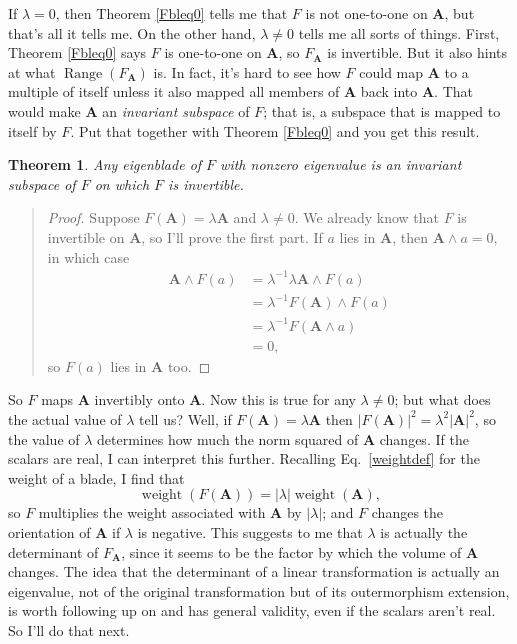 \documentclass{utarticle}
\newcommand{\bl}[1]{\ensuremath{\bm{#1}}}
\DeclareMathOperator{\out}{\wedge}
\newcommand{\weight}{\operatorname{weight}}
\newcommand{\Range}{\operatorname{Range}}
\newtheorem{thm}{Theorem}
\newcommand{\bp}{\begin{quotation} \begin{proof}}
\newcommand{\ep}{\end{proof} \end{quotation}}
\begin{document}
If $\lambda = 0$, then Theorem \ref{Fbleq0} tells me that $F$ is not one-to-one 
on \bl{A}, but that's all it tells me.  On the other hand, $\lambda \neq 0$ tells me all sorts of things.
First, Theorem \ref{Fbleq0} says $F$ is one-to-one on \bl{A}, so $F_{\bl{A}}$ is invertible.  But 
it also hints at what $\Range(F_{\bl{A}})$ is.  In fact, it's hard to see how $F$ could map \bl{A} 
to a multiple of itself unless it also mapped all members of \bl{A} back into \bl{A}.  That would 
make \bl{A} an \emph{invariant subspace} of $F$; that is, a subspace that is mapped to itself 
by $F$.  Put that together with Theorem \ref{Fbleq0} and you get this result.
\begin{thm}
Any eigenblade of $F$ with nonzero eigenvalue is an invariant subspace of $F$ on which $F$ 
is invertible.
\end{thm}
\bp
Suppose $F(\bl{A}) = \lambda\bl{A}$ and $\lambda \neq 0$.  We already know that $F$ is
invertible on \bl{A}, so I'll prove the first part.  If $a$ lies in \bl{A}, then $\bl{A} \out a = 0$, 
in which case
\begin{align}
\bl{A} \out F(a) & = \lambda^{-1} \lambda \bl{A} \out F(a) \nonumber \\
                           & = \lambda^{-1} F(\bl{A}) \out F(a) \nonumber \\
                           & = \lambda^{-1} F(\bl{A} \out a) \nonumber \\
                           & = 0,
\end{align}
so $F(a)$ lies in \bl{A} too. 
\ep
So $F$ maps \bl{A} invertibly onto \bl{A}.  Now this is true for any $\lambda \neq 0$; but what does the
actual value of $\lambda$ tell us?  Well, if $F(\bl{A}) = \lambda\bl{A}$ then $|F(\bl{A})|^2 = \lambda^2
|\bl{A}|^2$, so the value of $\lambda$ determines how much the norm squared of \bl{A} changes.  If 
the scalars are real, I can interpret this further.  Recalling Eq.~\eqref{weightdef} for the weight of a blade, I 
find that
\begin{equation} \weight(F(\bl{A})) = |\lambda| \weight(\bl{A}), \end{equation}
so $F$ multiplies the weight associated with \bl{A} by $|\lambda|$; and $F$ changes the orientation
of \bl{A} if $\lambda$ is negative.  This suggests to me that $\lambda$ is actually the determinant of 
$F_{\bl{A}}$, since it seems to be the factor by which the volume of \bl{A} changes.  The idea that the determinant 
of a linear transformation is actually an eigenvalue, not of the original transformation but of its 
outermorphism extension, is worth following up on and has general validity, even if the scalars aren't
real.  So I'll do that next.
\end{document}
